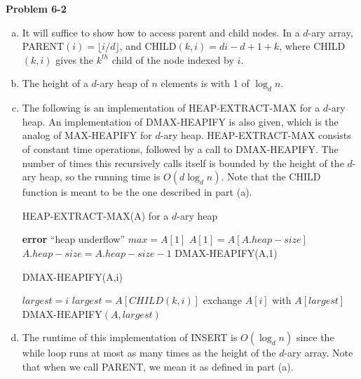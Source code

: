 \documentclass{article}
\begin{document}
\noindent\textbf{Problem 6-2}\\
\begin{enumerate}[a.]
\item It will suffice to show how to access parent and child nodes.  In a $d$-ary array, PARENT$(i) = \lfloor i/d \rfloor$, and CHILD$(k,i) = di - d + 1 + k$, where CHILD$(k,i)$ gives the $k^{th}$ child of the node indexed by $i$. \\

\item The height of a $d$-ary heap of $n$ elements is with 1 of $\log_d n$. \\

\item  The following is an implementation of HEAP-EXTRACT-MAX for a $d$-ary heap.  An implementation of DMAX-HEAPIFY is also given, which is the analog of MAX-HEAPIFY for $d$-ary heap.  HEAP-EXTRACT-MAX consists of constant time operations, followed by a call to DMAX-HEAPIFY.  The number of times this recursively calls itself is bounded by the height of the $d$-ary heap, so the running time is $O(d\log_d n)$.  Note that the CHILD function is meant to be the one described in part (a).\\

\begin{algorithm}
\caption{HEAP-EXTRACT-MAX(A) for a $d$-ary heap}
\begin{algorithmic}[1]
	\State \textbf{error} ``heap underflow''
\EndIf
\State $max = A[1]$
\State $A[1] = A[A.heap-size]$
\State $A.heap-size = A.heap-size - 1$
\State DMAX-HEAPIFY(A,1)
\end{algorithmic}
\end{algorithm}

\begin{algorithm}
\caption{DMAX-HEAPIFY(A,i)}
\begin{algorithmic}[1]
\State $largest = i$
			\State $largest = A[CHILD(k,i)]$
		\EndIf
	\EndIf
\EndFor
{}
	\State exchange $A[i]$ with $A[largest]$
	\State DMAX-HEAPIFY$(A,largest)$
\EndIf
\end{algorithmic}
\end{algorithm}

\item  The runtime of this implementation of INSERT is $O(\log_d n)$ since the while loop runs at most as many times as the height of the $d$-ary array.  Note that when we call PARENT, we mean it as defined in part (a).\\


\end{enumerate}
\end{document}
